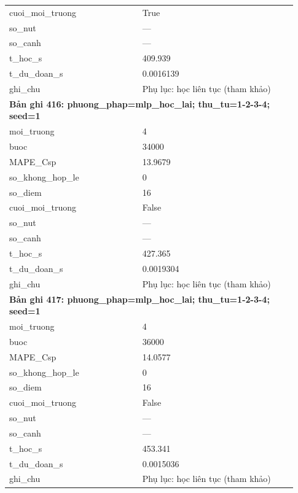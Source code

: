 \begin{longtable}{p{0.43\linewidth}p{0.50\linewidth}}
cuoi\_\allowbreak moi\_\allowbreak truong & True \\
so\_\allowbreak nut & — \\
so\_\allowbreak canh & — \\
t\_\allowbreak hoc\_\allowbreak s & 409.939 \\
t\_\allowbreak du\_\allowbreak doan\_\allowbreak s & 0.0016139 \\
ghi\_\allowbreak chu & Phụ lục: học liên tục (tham khảo) \\
\midrule
\multicolumn{2}{p{0.95\linewidth}}{\textbf{Bản ghi 416: phuong\_phap=mlp\_hoc\_lai; thu\_tu=1-2-3-4; seed=1}} \\
moi\_\allowbreak truong & 4 \\
buoc & 34000 \\
MAPE\_\allowbreak Csp & 13.9679 \\
so\_\allowbreak khong\_\allowbreak hop\_\allowbreak le & 0 \\
so\_\allowbreak diem & 16 \\
cuoi\_\allowbreak moi\_\allowbreak truong & False \\
so\_\allowbreak nut & — \\
so\_\allowbreak canh & — \\
t\_\allowbreak hoc\_\allowbreak s & 427.365 \\
t\_\allowbreak du\_\allowbreak doan\_\allowbreak s & 0.0019304 \\
ghi\_\allowbreak chu & Phụ lục: học liên tục (tham khảo) \\
\midrule
\multicolumn{2}{p{0.95\linewidth}}{\textbf{Bản ghi 417: phuong\_phap=mlp\_hoc\_lai; thu\_tu=1-2-3-4; seed=1}} \\
moi\_\allowbreak truong & 4 \\
buoc & 36000 \\
MAPE\_\allowbreak Csp & 14.0577 \\
so\_\allowbreak khong\_\allowbreak hop\_\allowbreak le & 0 \\
so\_\allowbreak diem & 16 \\
cuoi\_\allowbreak moi\_\allowbreak truong & False \\
so\_\allowbreak nut & — \\
so\_\allowbreak canh & — \\
t\_\allowbreak hoc\_\allowbreak s & 453.341 \\
t\_\allowbreak du\_\allowbreak doan\_\allowbreak s & 0.0015036 \\
ghi\_\allowbreak chu & Phụ lục: học liên tục (tham khảo) \\

\end{longtable}
